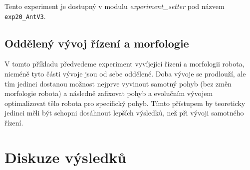 Tento experiment je dostupný v modulu \emph{experiment\_setter} pod názvem
\texttt{exp20\_AntV3}.



\subsection{Oddělený vývoj řízení a morfologie} \label{exp2:split_evo}

V tomto příkladu předvedeme experiment vyvíjející řízení a morfologii robota,
nicméně tyto části vývoje jsou od sebe oddělené. Doba vývoje se prodlouží, ale
tím jedinci dostanou možnost nejprve vyvinout samotný pohyb (bez změn
morfologie robota) a následně zafixovat pohyb a evolučním vývojem optimalizovat
tělo robota pro specifický pohyb. Tímto přístupem by teoreticky jedinci měli
být schopni dosáhnout lepších výsledků, než při vývoji samotného řízení.

\section{Diskuze výsledků}
